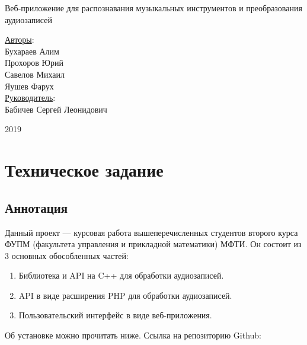 \documentclass[14pt,a4paper]{article}
\begin{document}
\text{}
\vskip 8cm
\begin{center}
\begin{minipage}{0.8\textwidth}
\begin{center}
\Huge Веб-приложение для распознавания музыкальных инструментов и преобразования аудиозаписей
\end{center}
\end{minipage}
\end{center}

\vskip 5.5cm

\begin{flushright}
\Large \underline{Авторы}: \\
Бухараев Алим \\
Прохоров Юрий \\
Савелов Михаил \\
Яушев Фарух \\
\bigskip
\Large \underline{Руководитель}: \\
Бабичев Сергей Леонидович
\end{flushright}

\vskip 2.6cm

\begin{center}
2019
\end{center}

\newpage

\renewcommand\contentsname{\huge Содержание}
\setcounter{tocdepth}{2}
\Large \tableofcontents
\normalsize

\newpage 

\section[Техническое задание]{\huge Техническое задание}

\subsection{Аннотация}

Данный проект --- курсовая работа вышеперечисленных студентов второго курса ФУПМ (факультета управления и прикладной математики) МФТИ. Он состоит из 3 основных обособленных частей:
\begin{enumerate}
\item Библиотека и API на C++ для обработки аудиозаписей.
\item API в виде расширения PHP для обработки аудиозаписей.
\item Пользовательский интерфейс в виде веб-приложения.
\end{enumerate}
Об установке можно прочитать ниже. Ссылка на репозиторию Github:\\\\
\\
\end{document}
